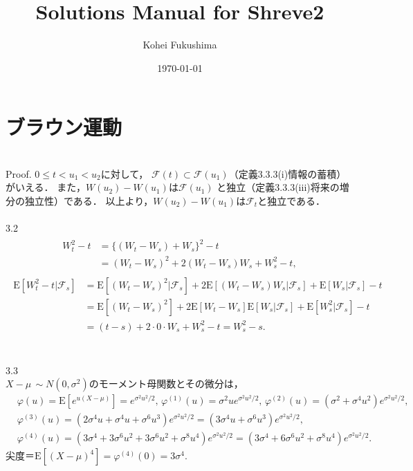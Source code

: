 \documentclass[a4paper,11pt]{jsarticle}
\title{Solutions Manual for Shreve2}
\author{Kohei Fukushima}
\date{\today}
\newcommand{\E}{\mathrm{E}}
\newcommand{\F}{\mathcal{F}}
\begin{document}
\maketitle
\pagestyle{fancy}
\rhead{\today}
\section{ブラウン運動}
\\
Proof.
$0 \leq t < u_1 < u_2$に対して，
$\mathcal{F}(t)\subset\mathcal{F}(u_1)$（定義3.3.3(i)情報の蓄積）がいえる．
また，$W(u_2)-W(u_1)$は$\mathcal{F}(u_1)$
と独立（定義3.3.3(iii)将来の増分の独立性）である．
以上より，$W(u_2)-W(u_1)$は$\F_t$と独立である．
\\ \\
3.2
\begin{align*}
  \begin{split}
    W_t^2-t&=\{(W_t-W_s)+W_s\}^2-t \\
    &=(W_t-W_s)^2+2(W_t-W_s)W_s+W_s^2-t,
  \end{split}
\end{align*}
\begin{align*}
  \begin{split}
    \E[W_t^2-t|\mathcal{F}_s]
    &=\E[(W_t-W_s)^2|\mathcal{F}_s]
    +2\E[(W_t-W_s)W_s|\mathcal{F}_s]
    +\E[W_s|\mathcal{F}_s]-t \\
    &=\E[(W_t-W_s)^2]+2\E[W_t-W_s]\E[W_s|\F_s]+\E[W_s^2|\F_s]-t\\
    &=(t-s)+2\cdot0\cdot W_s+W_s^2-t=W_s^2-s.
  \end{split}
\end{align*}
\\ \\
3.3\\
$X-\mu \, \sim N(0,\sigma^2)$のモーメント母関数とその微分は，
\begin{align*}
  &\varphi(u)=\E[e^{u(X-\mu)}]=e^{\sigma^2 u^2/2}, \,
  \varphi^{(1)}(u)=\sigma^2 u e^{\sigma^2 u^2/2}, \,
  \varphi^{(2)}(u)=(\sigma^2 + \sigma^4 u^2) e^{\sigma^2 u^2/2}, \\
  &\varphi^{(3)}(u)=(2\sigma^4 u + \sigma^4 u +\sigma^6 u^3)e^{\sigma^2 u^2/2}
  =(3\sigma^4 u + \sigma^6 u^3)e^{\sigma^2 u^2/2}, \\
  &\varphi^{(4)}(u)=(3\sigma^4 + 3\sigma^6 u^2 +3\sigma^6 u^2+ \sigma^8 u^4)
  e^{\sigma^2 u^2/2}
  =(3\sigma^4 + 6\sigma^6 u^2+ \sigma^8 u^4)e^{\sigma^2 u^2/2}.
\end{align*}
尖度＝$\E[(X-\mu)^4]=\varphi^{(4)}(0)=3\sigma^4$.
\end{document}
